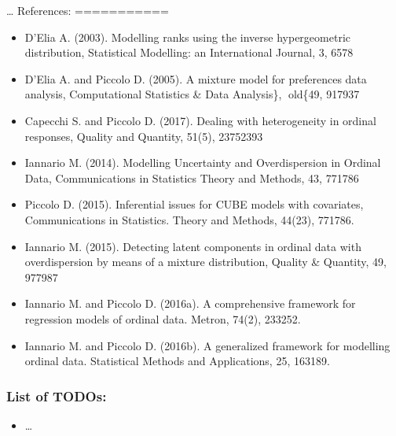 \documentclass[letterpaper,10pt,english]{sphinxmanual}
\begin{document}
\sphinxAtStartPar
…
References:
===========
\begin{itemize}
\item {} 
\sphinxAtStartPar
D’Elia A. (2003). Modelling ranks using the inverse hypergeometric distribution, Statistical Modelling: an International Journal, 3, 65\textendash{}78

\item {} 
\sphinxAtStartPar
D’Elia A. and Piccolo D. (2005). A mixture model for preferences data analysis, Computational Statistics \& Data Analysis\},  old\{49, 917\textendash{}937

\item {} 
\sphinxAtStartPar
Capecchi S. and Piccolo D. (2017). Dealing with heterogeneity in ordinal responses, Quality and Quantity, 51(5), 2375\textendash{}2393

\item {} 
\sphinxAtStartPar
Iannario M. (2014). Modelling Uncertainty and Overdispersion in Ordinal Data, Communications in Statistics \sphinxhyphen{} Theory and Methods, 43, 771\textendash{}786

\item {} 
\sphinxAtStartPar
Piccolo D. (2015). Inferential issues for CUBE models with covariates, Communications in Statistics. Theory and Methods, 44(23), 771\textendash{}786.

\item {} 
\sphinxAtStartPar
Iannario M. (2015). Detecting latent components in ordinal data with overdispersion by means of a mixture distribution, Quality \& Quantity, 49, 977\textendash{}987

\item {} 
\sphinxAtStartPar
Iannario M. and Piccolo D. (2016a). A comprehensive framework for regression models of ordinal data. Metron, 74(2), 233\textendash{}252.

\item {} 
\sphinxAtStartPar
Iannario M. and Piccolo D. (2016b). A generalized framework for modelling ordinal data. Statistical Methods and Applications, 25, 163\textendash{}189.

\end{itemize}


\subsubsection{List of TODOs:}
\label{\detokenize{cubmods:id250}}\begin{itemize}
\item {} 
\sphinxAtStartPar
…

\end{itemize}
\end{document}
